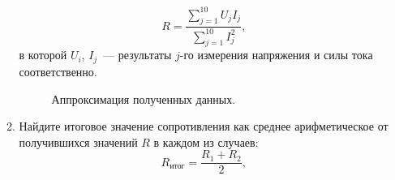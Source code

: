 \documentclass[12pt, a4paper, openany]{extarticle}
\begin{document}
\begin{enumerate}
\begin{enumerate}
\begin{equation}
	R = \frac{\sum\limits_{j=1}^{10}U_jI_j}{\sum\limits_{j=1}^{10}I^2_j},
\end{equation}
в которой $U_i$, $I_j$~--- результаты $j$-го измерения напряжения и силы тока соответственно.
\begin{figure}[h]
	\caption{Аппроксимация полученных данных.}
	\label{least_squares_method}
\end{figure}
\item Найдите итоговое значение сопротивления как среднее арифметическое от получившихся значений $R$ в каждом из случаев:
\begin{equation}
	R_\textit{итог} = \frac{R_1+R_2}{2},
\end{equation}
\end{enumerate}


\end{enumerate}
\end{document}
